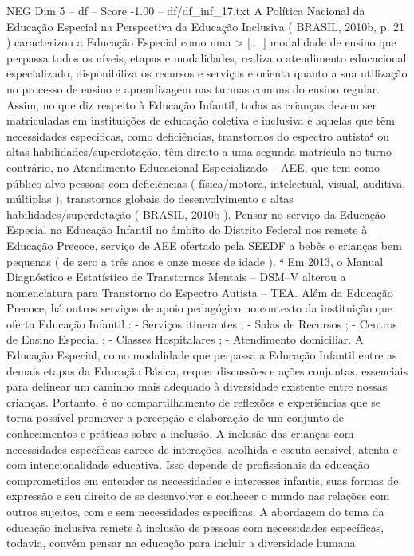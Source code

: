 \begin{textsample}{NEG Dim 5 – df – Score -1.00 – df/df\_inf\_17.txt}
A Política Nacional da Educação Especial na Perspectiva da Educação Inclusiva ( BRASIL, 2010b, p. 21 ) caracterizou a Educação Especial como uma > [... ] modalidade de ensino que perpassa todos os níveis, etapas e modalidades, realiza o atendimento educacional especializado, disponibiliza os recursos e serviços e orienta quanto a sua utilização no processo de ensino e aprendizagem nas turmas comuns do ensino regular.
Assim, no que diz respeito à Educação Infantil, todas as crianças devem ser matriculadas em instituições de educação coletiva e inclusiva e aquelas que têm necessidades específicas, como deficiências, transtornos do espectro autista⁴ ou altas habilidades/superdotação, têm direito a uma segunda matrícula no turno contrário, no Atendimento Educacional Especializado – AEE, que tem como público-alvo pessoas com deficiências ( física/motora, intelectual, visual, auditiva, múltiplas ), transtornos globais do desenvolvimento e altas habilidades/superdotação ( BRASIL, 2010b ).
Pensar no serviço da Educação Especial na Educação Infantil no âmbito do Distrito Federal nos remete à Educação Precoce, serviço de AEE ofertado pela SEEDF a bebês e crianças bem pequenas ( de zero a três anos e onze meses de idade ). ⁴ Em 2013, o Manual Diagnóstico e Estatístico de Transtornos Mentais – DSM–V alterou a nomenclatura para Transtorno do Espectro Autista – TEA.
Além da Educação Precoce, há outros serviços de apoio pedagógico no contexto da instituição que oferta Educação Infantil : - Serviços itinerantes ; - Salas de Recursos ; - Centros de Ensino Especial ; - Classes Hospitalares ; - Atendimento domiciliar.
A Educação Especial, como modalidade que perpassa a Educação Infantil entre as demais etapas da Educação Básica, requer discussões e ações conjuntas, essenciais para delinear um caminho mais adequado à diversidade existente entre nossas crianças.
Portanto, é no compartilhamento de reflexões e experiências que se torna possível promover a percepção e elaboração de um conjunto de conhecimentos e práticas sobre a inclusão.
A inclusão das crianças com necessidades específicas carece de interações, acolhida e escuta sensível, atenta e com intencionalidade educativa.
Isso depende de profissionais da educação comprometidos em entender as necessidades e interesses infantis, suas formas de expressão e seu direito de se desenvolver e conhecer o mundo nas relações com outros sujeitos, com e sem necessidades específicas.
A abordagem do tema da educação inclusiva remete à inclusão de pessoas com necessidades específicas, todavia, convém pensar na educação para incluir a diversidade humana.

\end{textsample}

